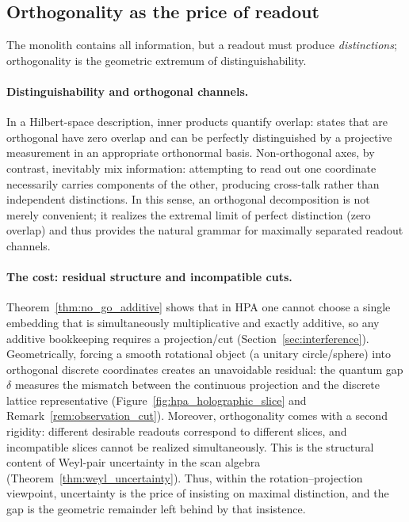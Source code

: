 \subsection{Orthogonality as the price of readout}
\label{subsec:orthogonality_price_of_readout}
The monolith contains all information, but a readout must produce \emph{distinctions}; orthogonality is the geometric extremum of distinguishability.

\paragraph{Distinguishability and orthogonal channels.}
In a Hilbert-space description, inner products quantify overlap: states that are orthogonal have zero overlap and can be perfectly distinguished by a projective measurement in an appropriate orthonormal basis.
Non-orthogonal axes, by contrast, inevitably mix information: attempting to read out one coordinate necessarily carries components of the other, producing cross-talk rather than independent distinctions.
In this sense, an orthogonal decomposition is not merely convenient; it realizes the extremal limit of perfect distinction (zero overlap) and thus provides the natural grammar for maximally separated readout channels.

\paragraph{The cost: residual structure and incompatible cuts.}
Theorem~\ref{thm:no_go_additive} shows that in HPA one cannot choose a single embedding that is simultaneously multiplicative and exactly additive, so any additive bookkeeping requires a projection/cut (Section~\ref{sec:interference}).
Geometrically, forcing a smooth rotational object (a unitary circle/sphere) into orthogonal discrete coordinates creates an unavoidable residual: the quantum gap $\delta$ measures the mismatch between the continuous projection and the discrete lattice representative (Figure~\ref{fig:hpa_holographic_slice} and Remark~\ref{rem:observation_cut}).
Moreover, orthogonality comes with a second rigidity: different desirable readouts correspond to different slices, and incompatible slices cannot be realized simultaneously. This is the structural content of Weyl-pair uncertainty in the scan algebra (Theorem~\ref{thm:weyl_uncertainty}).
Thus, within the rotation--projection viewpoint, uncertainty is the price of insisting on maximal distinction, and the gap is the geometric remainder left behind by that insistence.

